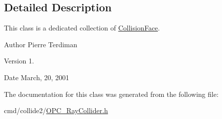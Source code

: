 \subsection{Detailed Description}
This class is a dedicated collection of \hyperlink{classCollisionFace}{Collision\+Face}.

\begin{DoxyAuthor}{Author}
Pierre Terdiman 
\end{DoxyAuthor}
\begin{DoxyVersion}{Version}
1. 
\end{DoxyVersion}
\begin{DoxyDate}{Date}
March, 20, 2001 
\end{DoxyDate}


The documentation for this class was generated from the following file\+:\begin{DoxyCompactItemize}
\item 
cmd/collide2/\hyperlink{OPC__RayCollider_8h}{O\+P\+C\+\_\+\+Ray\+Collider.\+h}\end{DoxyCompactItemize}
